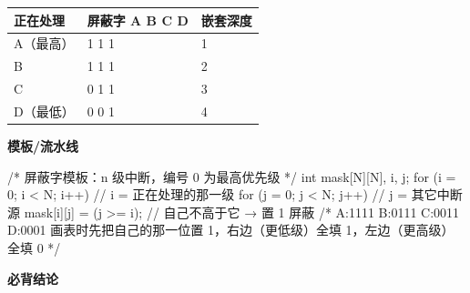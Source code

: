 \documentclass[10pt,a4paper]{ctexart}
\begin{document}
\begin{center}\small
\begin{tabularx}{\linewidth}{@{}l>{\raggedright\arraybackslash}Xl@{}}
\toprule
正在处理 & 屏蔽字 A B C D & 嵌套深度 \\
\midrule
A（最高） & 1 1 1 1 & 1 \\
B & 0 1 1 1 & 2 \\
C & 0 0 1 1 & 3 \\
D（最低） & 0 0 0 1 & 4 \\
\bottomrule
\end{tabularx}
\end{center}

\textbf{模板/流水线}

\begin{codebox}
/* 屏蔽字模板：n 级中断，编号 0 为最高优先级 */
int mask[N][N], i, j;
for (i = 0; i < N; i++)              // i = 正在处理的那一级
    for (j = 0; j < N; j++)          // j = 其它中断源
        mask[i][j] = (j >= i);       // 自己不高于它 → 置 1 屏蔽
/* A:1111  B:0111  C:0011  D:0001
   画表时先把自己的那一位置 1，右边（更低级）全填 1，左边（更高级）全填 0 */
\end{codebox}





\textbf{必背结论}
\end{document}
